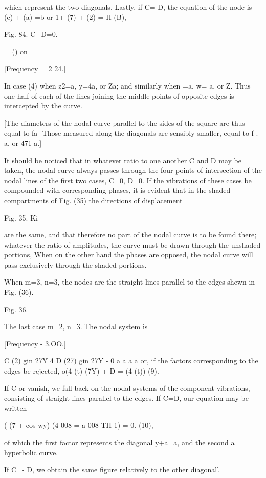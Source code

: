 which represent the two diagonals. Lastly, if C= D, the equation of the
node is (e) + (a) =b or 1+ (7) + (2) = H (B),

Fig. 84. C+D=0.

= () on

[Frequency = 2 24.]

In case (4) when z2=a, y=4a, or Za; and similarly when =a, w= a, or Z.
Thus one half of each of the lines joining the middle points of opposite
edges is intercepted by the curve.

[The diameters of the nodal curve parallel to the sides of the
square are thus equal to fa- Those measured along the diagonals
are sensibly smaller, equal to f . a, or 471 a.]


It should be noticed that in whatever ratio to one another C and D may
be taken, the nodal curve always passes through the four points of
intersection of the nodal lines of the first two cases, C=0, D=0. If the
vibrations of these cases be compounded with corresponding phases, it is
evident that in the shaded compartments of Fig. (35) the directions of
displacement

Fig. 35. Ki


are the same, and that therefore no part of the nodal curve is to be
found there; whatever the ratio of amplitudes, the curve must be drawn
through the unshaded portions, When on the other hand the phases are
opposed, the nodal curve will pass exclusively through the shaded
portions.

When m=3, n=3, the nodes are the straight lines parallel to the edges
shewn in Fig. (36).

Fig. 36.


The last case
m=2, n=3. The nodal system is

[Frequency - 3.OO.]

C (2) gin 27Y 4 D (27) gin 27Y - 0 a a a a
or, if the factors corresponding to the edges be rejected, o(4 (t) (7Y)
+ D = (4 (t)) (9).

If C or vanish, we fall back on the nodal systems of the component
vibrations, consisting of straight lines parallel to the edges. If C=D,
our equation may be written

( (7 +-cos wy) (4 008 = a 008 TH 1) = 0. (10),

of which the first factor represents the diagonal y+a=a, and the second
a hyperbolic curve.

If C=- D, we obtain the same figure relatively to the other diagonal'.

\setcounter{equation}{0}
